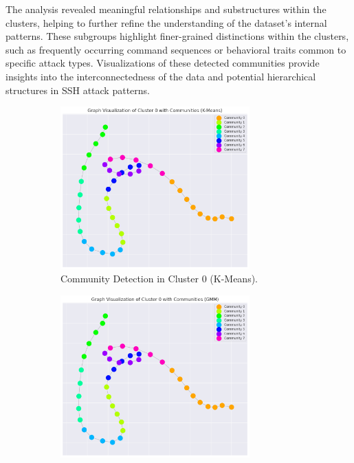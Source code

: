                 The analysis revealed meaningful relationships and substructures within the clusters, helping to further refine the understanding of the dataset's internal patterns. These subgroups highlight finer-grained distinctions within the clusters, such as frequently occurring command sequences or behavioral traits common to specific attack types. Visualizations of these detected communities provide insights into the interconnectedness of the data and potential hierarchical structures in SSH attack patterns.

                \begin{figure}[H]
                    \centering
                    \begin{subfigure}[c]{0.47\textwidth}
                        \centering
                        \includegraphics[width=0.8\textwidth]{../figures/plots/section3/k-means_graph_visualization_of_cluster_0_with_communities.png}
                        \caption{Community Detection in Cluster 0 (K-Means).}
                        \label{fig:kmeans_graph}
                    \end{subfigure}
                    \hfill
                    \begin{subfigure}[c]{0.47\textwidth}
                        \centering
                        \includegraphics[width=0.8\textwidth]{../figures/plots/section3/gmm_graph_visualization_of_cluster_0_with_communities.png}

\end{subfigure}
\end{figure}
